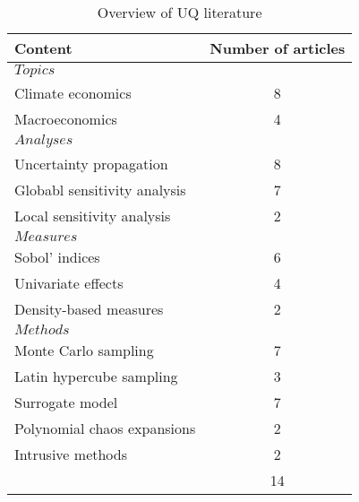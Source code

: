 \begin{table}[H]
	\centering
	\caption{Overview of UQ literature}
	\label{tab:lit}
	\renewcommand{\arraystretch}{1.2}%
	\begin{tabular}{lc}
		\toprule
		Content                      & Number of articles \\ \midrule
		$Topics$                       &                    \\
		\qquad Climate economics            & 8                  \\
		\qquad Macroeconomics               & 4                 \\ \midrule
		$Analyses$                     &                    \\
		\qquad Uncertainty propagation      & 8                  \\
		\qquad Globabl sensitivity analysis & 7                  \\
		\qquad Local sensitivity analysis   & 2                  \\ \midrule
		$Measures$                     &                    \\
		\qquad Sobol' indices               & 6                  \\
		\qquad Univariate effects           & 4                  \\
		\qquad Density-based measures & 2                  \\ \midrule
		$Methods$                      &                    \\
		\qquad Monte Carlo sampling         & 7                  \\
		\qquad Latin hypercube sampling         & 3                  \\
		\qquad Surrogate model              & 7                  \\
		\qquad Polynomial chaos expansions  & 2                  \\
		\qquad Intrusive methods            & 2                  \\ \midrule
		& 14                 \\ \bottomrule
	\end{tabular}
\end{table}
\noindent
